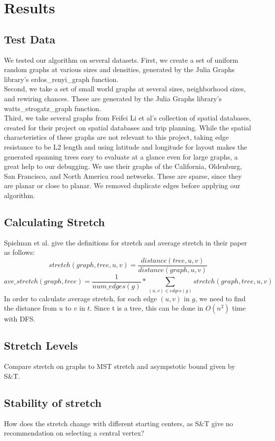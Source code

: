 \documentclass{article}
\begin{document}
\section*{Results}
\subsection*{Test Data}
We tested our algorithm on several datasets.  First, we create a set of uniform random graphs at various sizes and densities, generated by the Julia Graphs library's erdos\_renyi\_graph function.\\
Second, we take a set of small world graphs at several sizes, neighborhood sizes, and rewiring chances.  These are generated by the Julia Graphs library's watts\_strogatz\_graph function.\\
Third, we take several graphs from Feifei Li et al's collection of spatial databases\cite{feifei-data}, created for their project on spatial databases and trip planning\cite{feifei-paper}.  While the spatial characteristics of these graphs are not relevant to this project, taking edge resistance to be L2 length and using latitude and longitude for layout makes the generated spanning trees easy to evaluate at a glance even for large graphs, a great help to our debugging.  We use their graphs of the California, Oldenburg, San Francisco, and North America road networks.  These are sparse, since they are planar or close to planar.  We removed duplicate edges before applying our algorithm.
\subsection*{Calculating Stretch}
Spielman et al. give the definitions for stretch and average stretch in their paper as follows:
$$stretch(graph, tree, u, v) = \frac{distance(tree, u, v)}{distance(graph, u, v)}$$
$$ave\_stretch(graph, tree) = \frac{1}{num\_edges(g)}*\sum\limits_{(u,v)\in edges(g)}stretch(graph, tree, u, v)$$
In order to calculate average stretch, for each edge $(u,v)$ in $g$, we need to find the distance from $u$ to $v$ in $t$.  Since t is a tree, this can be done in $O(n^2)$ time with DFS.
\subsection*{Stretch Levels}
Compare stretch on graphs to MST stretch and asympstotic bound given by S\&T.
\subsection*{Stability of stretch}
How does the stretch change with different starting centers, as S\&T give no recommendation on selecting a central vertex?
{}

\end{document}
